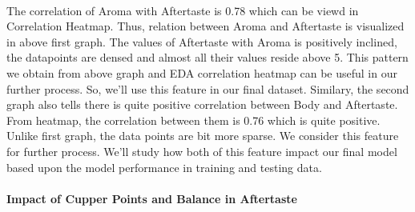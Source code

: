 \documentclass[11pt]{article}
\begin{document}
    \begin{center}
    \end{center}
    { \hspace*{\fill} \\}
    
    The correlation of Aroma with Aftertaste is 0.78 which can be viewd in
Correlation Heatmap. Thus, relation between Aroma and Aftertaste is
visualized in above first graph. The values of Aftertaste with Aroma is
positively inclined, the datapoints are densed and almost all their
values reside above 5. This pattern we obtain from above graph and EDA
correlation heatmap can be useful in our further process. So, we'll use
this feature in our final dataset. Similary, the second graph also tells
there is quite positive correlation between Body and Aftertaste. From
heatmap, the correlation between them is 0.76 which is quite positive.
Unlike first graph, the data points are bit more sparse. We consider
this feature for further process. We'll study how both of this feature
impact our final model based upon the model performance in training and
testing data.

    \hypertarget{impact-of-cupper-points-and-balance-in-aftertaste}{%
\paragraph{Impact of Cupper Points and Balance in
Aftertaste}\label{impact-of-cupper-points-and-balance-in-aftertaste}}
\end{document}
